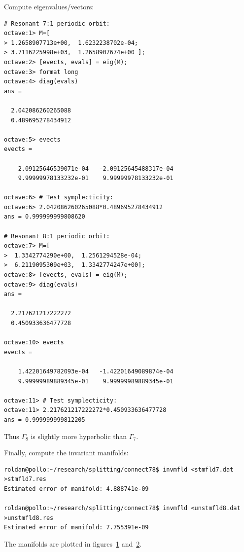 \documentclass[a4paper]{amsart}
\theoremstyle{remark}
\begin{document}
Compute eigenvalues/vectors:

\begin{verbatim}
# Resonant 7:1 periodic orbit:
octave:1> M=[
> 1.2658907713e+00,  1.6232238702e-04;
> 3.7116225998e+03,  1.2658907674e+00 ];
octave:2> [evects, evals] = eig(M);
octave:3> format long
octave:4> diag(evals)
ans =

  2.042086260265088
  0.489695278434912

octave:5> evects
evects =

    2.09125646539071e-04   -2.09125645488317e-04
    9.99999978133232e-01    9.99999978133232e-01

octave:6> # Test symplecticity:
octave:6> 2.042086260265088*0.489695278434912
ans = 0.999999999808620

# Resonant 8:1 periodic orbit:
octave:7> M=[
>  1.3342774290e+00,  1.2561294528e-04;
>  6.2119095309e+03,  1.3342774247e+00];
octave:8> [evects, evals] = eig(M);
octave:9> diag(evals)
ans =

  2.217621217222272
  0.450933636477728

octave:10> evects
evects =

    1.42201649782093e-04   -1.42201649089874e-04
    9.99999989889345e-01    9.99999989889345e-01

octave:11> # Test symplecticity:
octave:11> 2.217621217222272*0.450933636477728
ans = 0.999999999812205
\end{verbatim}

Thus $\Gamma_{8}$ is slightly more hyperbolic than $\Gamma_{7}$.

Finally, compute the invariant manifolds:
\begin{verbatim}
roldan@pollo:~/research/splitting/connect78$ invmfld <stmfld7.dat
>stmfld7.res 
Estimated error of manifold: 4.888741e-09

roldan@pollo:~/research/splitting/connect78$ invmfld <unstmfld8.dat
>unstmfld8.res 
Estimated error of manifold: 7.755391e-09
\end{verbatim}
The manifolds are plotted in figures~\ref{fig:invmfld78}
and~\ref{fig:invmfld78_zoom}. 

\begin{figure}
\caption{}
\label{fig:invmfld78}
\end{figure}

\begin{figure}
\caption{}
\label{fig:invmfld78_zoom}
\end{figure}
\end{document}
